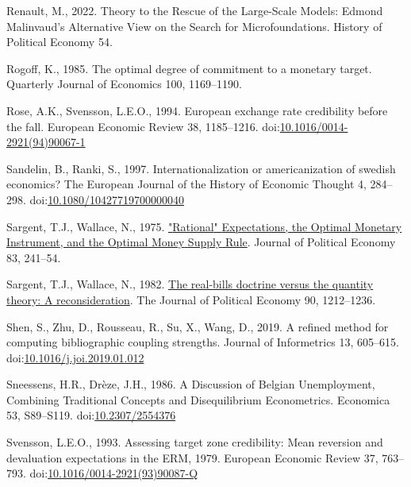 \documentclass[
]{article}
\newlength{\cslhangindent}
\newlength{\cslentryspacingunit} %
\newenvironment{CSLReferences}[2] %
 {%
  \setlength{\parindent}{0pt}
  \ifodd #1
  \let\oldpar\par
  \def\par{\hangindent=\cslhangindent\oldpar}
  \fi
  \setlength{\parskip}{#2\cslentryspacingunit}
 }%
 {}
\begin{document}
\begin{CSLReferences}{1}{0}
\leavevmode{}%
Renault, M., 2022. Theory to the {Rescue} of the {Large-Scale Models}:
{Edmond Malinvaud}'s {Alternative View} on the {Search} for
{Microfoundations}. History of Political Economy 54.

\leavevmode{}%
Rogoff, K., 1985. The optimal degree of commitment to a monetary target.
Quarterly Journal of Economics 100, 1169--1190.

\leavevmode{}%
Rose, A.K., Svensson, L.E.O., 1994. European exchange rate credibility
before the fall. European Economic Review 38, 1185--1216.
doi:\href{https://doi.org/10.1016/0014-2921(94)90067-1}{10.1016/0014-2921(94)90067-1}

\leavevmode{}%
Sandelin, B., Ranki, S., 1997. Internationalization or americanization
of swedish economics? The European Journal of the History of Economic
Thought 4, 284--298.
doi:\href{https://doi.org/10.1080/10427719700000040}{10.1080/10427719700000040}

\leavevmode{}%
Sargent, T.J., Wallace, N., 1975.
\href{http://econpapers.repec.org/article/ucpjpolec/v_3A83_3Ay_3A1975_3Ai_3A2_3Ap_3A241-54.htm}{"{Rational}"
{Expectations}, the {Optimal} {Monetary} {Instrument}, and the {Optimal}
{Money} {Supply} {Rule}}. Journal of Political Economy 83, 241--54.

\leavevmode{}%
Sargent, T.J., Wallace, N., 1982.
\href{http://www.jstor.org/stable/1830945}{The real-bills doctrine
versus the quantity theory: {A} reconsideration}. The Journal of
Political Economy 90, 1212--1236.

\leavevmode{}%
Shen, S., Zhu, D., Rousseau, R., Su, X., Wang, D., 2019. A refined
method for computing bibliographic coupling strengths. Journal of
Informetrics 13, 605--615.
doi:\href{https://doi.org/10.1016/j.joi.2019.01.012}{10.1016/j.joi.2019.01.012}

\leavevmode{}%
Sneessens, H.R., Drèze, J.H., 1986. A {Discussion} of {Belgian
Unemployment}, {Combining Traditional Concepts} and {Disequilibrium
Econometrics}. Economica 53, S89--S119.
doi:\href{https://doi.org/10.2307/2554376}{10.2307/2554376}

\leavevmode{}%
Svensson, L.E.O., 1993. Assessing target zone credibility: {Mean}
reversion and devaluation expectations in the {ERM},
1979. European Economic Review 37, 763--793.
doi:\href{https://doi.org/10.1016/0014-2921(93)90087-Q}{10.1016/0014-2921(93)90087-Q}


\end{CSLReferences}
\end{document}

